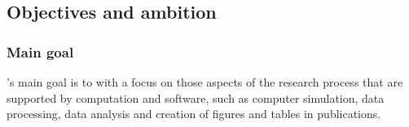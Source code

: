 \subsection{Objectives and ambition}


%
%
%
%

\subsubsection{Main goal}

\TheProject's main goal is to  with a focus on those aspects of the research process that
are supported by computation and software, such as computer simulation, data
processing, data analysis and creation of figures and tables in publications.

